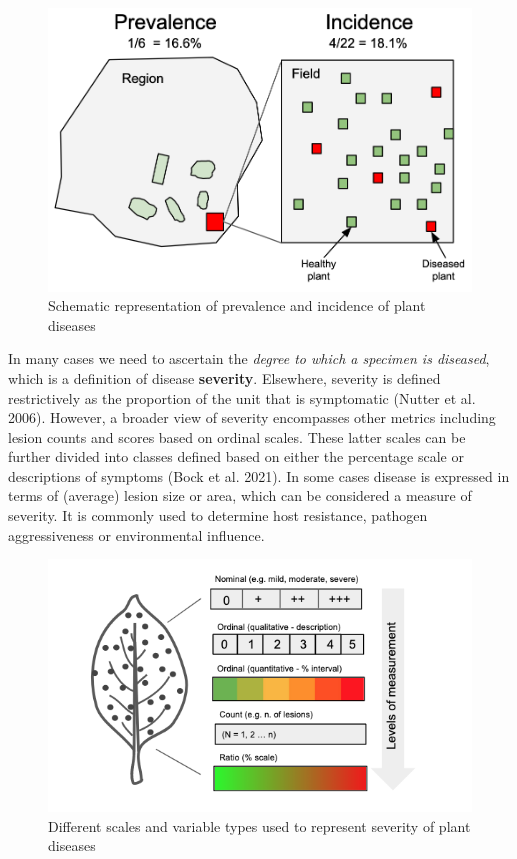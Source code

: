 \documentclass[
  letterpaper,
  DIV=11,
  numbers=noendperiod]{scrreprt}
\begin{document}
\begin{figure}

{\centering \includegraphics[width=5in,height=\textheight]{./imgs/prevalence_incidence.png}

}

\caption{Schematic representation of prevalence and incidence of plant
diseases}

\end{figure}

In many cases we need to ascertain the \emph{degree to which a specimen
is diseased}, which is a definition of disease \textbf{severity}.
Elsewhere, severity is defined restrictively as the proportion of the
unit that is symptomatic (Nutter et al. 2006). However, a broader view
of severity encompasses other metrics including lesion counts and scores
based on ordinal scales. These latter scales can be further divided into
classes defined based on either the percentage scale or descriptions of
symptoms (Bock et al. 2021). In some cases disease is expressed in terms
of (average) lesion size or area, which can be considered a measure of
severity. It is commonly used to determine host resistance, pathogen
aggressiveness or environmental influence.

\begin{figure}

{\centering \includegraphics[width=4.58333in,height=\textheight]{./imgs/severity.png}

}

\caption{Different scales and variable types used to represent severity
of plant diseases}

\end{figure}
\end{document}
